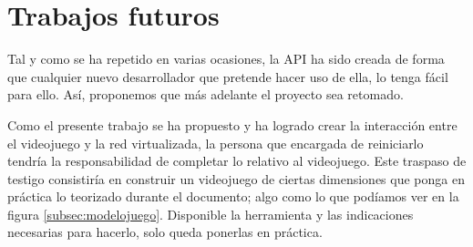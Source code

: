 \section{Trabajos futuros}
Tal y como se ha repetido en varias ocasiones, la API ha sido creada de forma que cualquier nuevo desarrollador que pretende hacer uso de ella, lo tenga fácil para ello. Así, proponemos que más adelante el proyecto sea retomado. 

Como el presente trabajo se ha propuesto y ha logrado crear la interacción entre el videojuego y la red virtualizada, la persona que encargada de reiniciarlo tendría la responsabilidad de completar lo relativo al videojuego. Este traspaso de testigo consistiría en construir un videojuego de ciertas dimensiones que ponga en práctica lo teorizado durante el documento; algo como lo que podíamos ver en la figura \ref{subsec:modelojuego}. Disponible la herramienta y las indicaciones necesarias para hacerlo, solo queda ponerlas en práctica.